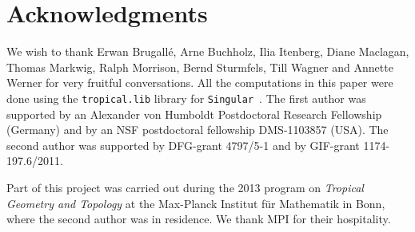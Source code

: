 \documentclass[11pt]{amsart}
\numberwithin{equation}{section}
\theoremstyle{plain}
\theoremstyle{definition}
\theoremstyle{remark}
\begin{document}
\section*{Acknowledgments}
We wish to thank Erwan Brugall\'{e}, Arne Buchholz, Ilia Itenberg,
Diane Maclagan, Thomas Markwig, Ralph Morrison, Bernd
Sturmfels, Till Wagner and Annette Werner for very fruitful
conversations. All the computations in this paper were done using the
\texttt{tropical.lib} library for \texttt{Singular}~\cite{JMM07a}.
The first author was supported by an Alexander von Humboldt
Postdoctoral Research Fellowship (Germany) and by an NSF postdoctoral
fellowship DMS-1103857 (USA). The second author was supported by
DFG-grant 4797/5-1 and by GIF-grant 1174-197.6/2011.

Part of this project was carried out during the 2013 program on \emph{Tropical Geometry and Topology} at the
Max-Planck Institut f\"ur Mathematik in Bonn, where the second author was in
residence. We thank MPI for their hospitality.
\end{document}
